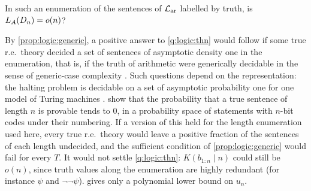 \begin{question}\label{q:logic:thn}
In such an enumeration of the sentences of $\mathcal{L}_{\mathrm{ar}}$ labelled by truth, is $L_{A}(D_n)=o(n)$?
\end{question}

By \cref{prop:logic:generic}, a positive answer to \cref{q:logic:thn} would follow if some true r.e.\ theory decided a set of sentences of asymptotic density one in the enumeration, that is, if the truth of arithmetic were generically decidable in the sense of generic-case complexity \citep{myasnikov2008generic}. Such questions depend on the representation: the halting problem is decidable on a set of asymptotic probability one for one model of Turing machines \citep{hamkins2006halting}. \citet{calude2005complexity} show that the probability that a true sentence of length $n$ is provable tends to $0$, in a probability space of statements with $n$-bit codes under their numbering. If a version of this held for the length enumeration used here, every true r.e.\ theory would leave a positive fraction of the sentences of each length undecided, and the sufficient condition of \cref{prop:logic:generic} would fail for every $T$. It would not settle \cref{q:logic:thn}: $K(b_{1:n}\mid n)$ could still be $o(n)$, since truth values along the enumeration are highly redundant (for instance $\psi$ and $\neg\neg\psi$).  gives only a polynomial lower bound on $u_n$.
